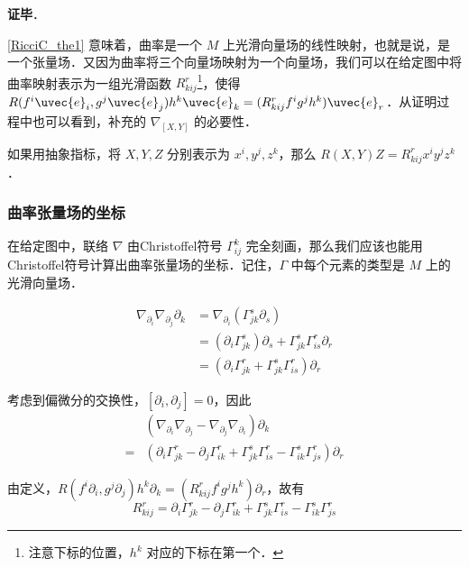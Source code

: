 \textbf{证毕}．

\autoref{RicciC_the1} 意味着，曲率是一个 $M$ 上光滑向量场的线性映射，也就是说，是一个张量场．又因为曲率将三个向量场映射为一个向量场，我们可以在给定图中将曲率映射表示为一组光滑函数 $R^r_{kij}$\footnote{注意下标的位置，$h^k$ 对应的下标在第一个．}，使得 $R(f^i\uvec{e}_i, g^j\uvec{e}_j)h^k\uvec{e}_k=(R^r_{kij}f^ig^jh^k)\uvec{e}_r$．从证明过程中也可以看到，补充的 $\nabla_{[X, Y]}$ 的必要性．

如果用抽象指标，将 $X, Y, Z$ 分别表示为 $x^i, y^j, z^k$，那么 $R(X, Y)Z=R^r_{kij}x^iy^jz^k$．


\subsubsection{曲率张量场的坐标}

在给定图中，联络 $\nabla$ 由Christoffel符号 $\Gamma^k_{ij}$ 完全刻画，那么我们应该也能用Christoffel符号计算出曲率张量场的坐标．记住，$\Gamma$ 中每个元素的类型是 $M$ 上的光滑向量场．

\begin{equation}
\begin{aligned}
\nabla_{\partial_i}\nabla_{\partial_j}\partial_k&=\nabla_{\partial_i}(\Gamma^s_{jk}\partial_s)\\
&=(\partial_i\Gamma^s_{jk})\partial_s+\Gamma^s_{jk}\Gamma^r_{is}\partial_r\\
&=(\partial_i\Gamma^r_{jk}+\Gamma^s_{jk}\Gamma^r_{is})\partial_r
\end{aligned}
\end{equation}


考虑到偏微分的交换性，$[\partial_i, \partial_j]=0$，因此
\begin{equation}
\begin{aligned}
&(\nabla_{\partial_i}\nabla_{\partial_j}-\nabla_{\partial_j}\nabla_{\partial_i})\partial_k\\
={}&(\partial_i\Gamma^r_{jk}-\partial_j\Gamma^{r}_{ik}+\Gamma^s_{jk}\Gamma^r_{is}-\Gamma^s_{ik}\Gamma^r_{js})\partial_r
\end{aligned}
\end{equation}

由定义，$R(f^i\partial_i, g^j\partial_j)h^k\partial_k=(R^r_{kij}f^ig^jh^k)\partial_r$，故有
\begin{equation}\label{RicciC_eq1}
R^r_{kij}=\partial_i\Gamma^r_{jk}-\partial_j\Gamma^{r}_{ik}+\Gamma^s_{jk}\Gamma^r_{is}-\Gamma^s_{ik}\Gamma^r_{js}
\end{equation}

